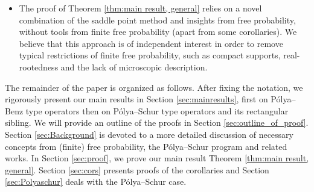 \documentclass[reqno]{amsart}
\newcommand{\1}{\mathbf{1}}
\newcommand{\R}{\mathbb{R}}
\def\R{\mathbb{R}}
\newcommand{\LP}{\mathcal{LP}}
\theoremstyle{plain}
\theoremstyle{definition}
\theoremstyle{remark}
\numberwithin{equation}{section}
\begin{document}
\begin{itemize}
	\item 
	The proof of Theorem \ref{thm:main result, general} relies on a novel combination of the saddle point method and insights from free probability, without tools from finite free probability (apart from some corollaries). We believe that this approach is of independent interest in order to remove typical restrictions of finite free probability, such as compact supports, real-rootedness and the lack of microscopic description.
\end{itemize} 	

The remainder of the paper is organized as follows. After fixing the notation, we rigorously present our main results in Section \ref{sec:mainresults}, first on P\'olya--Benz type operators then on P\'olya--Schur type operators and its rectangular sibling. We will provide an outline of the proofs in Section \ref{sec:outline_of_proof}. Section \ref{sec:Background} is devoted to a more detailed discussion of necessary concepts from (finite) free probability, the P\'olya--Schur program and related works. In Section \ref{sec:proof}, we prove our main result Theorem \ref{thm:main result, general}. Section \ref{sec:cors} presents proofs of the corollaries and Section \ref{sec:Polyaschur} deals with the P\'olya--Schur case. 


\end{document}
